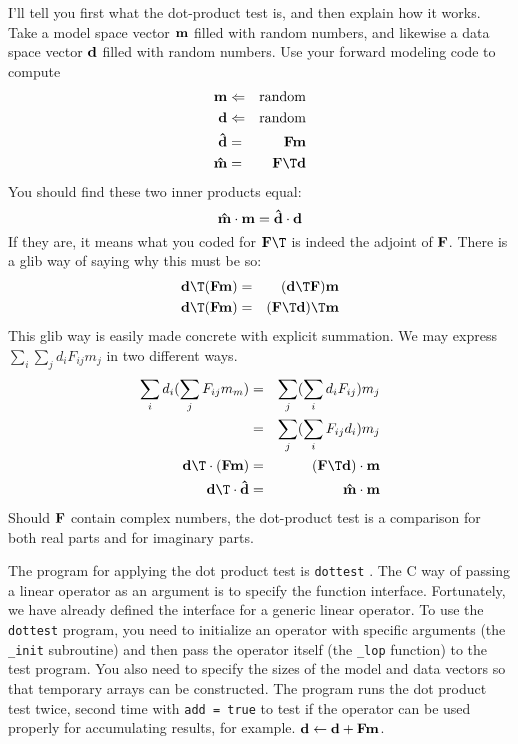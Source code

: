 \par
I'll tell you first what the dot-product test is,
and then explain how it works.
Take a model space vector $\bold m$ filled with random numbers, and likewise
a data space  vector $\bold d$ filled with random numbers.
Use your forward modeling code to compute
\begin{eqnarray}
\bold m & \Leftarrow & {\rm random}
\\
\bold d & \Leftarrow & {\rm random}
\\
\bold {\hat d} &=& \bold F \bold m
\\
\bold {\hat m} &=& \bold F\T \bold d
\end{eqnarray}
You should find these two inner products equal:
\begin{equation}
\bold {\hat m} \cdot \bold m  =
\bold {\hat d} \cdot \bold d
\end{equation}
If they are, it means what you coded for $\bold F\T$ is indeed the adjoint of $\bold F$.
There is a glib way of saying why this must be so:
\begin{eqnarray}
\bold d\T ( \bold F \bold m ) &=& ( \bold d\T \bold F )  \bold m   \\
\bold d\T ( \bold F \bold m ) &=& ( \bold F\T \bold d )\T \bold m 
\label{eqn:bilin2}
\end{eqnarray}
This glib way is easily made concrete with explicit summation.
We may express $\sum_i \sum_j d_i F_{ij} m_j$ in two different ways.
\begin{eqnarray}
\sum_i d_i ( \sum_j F_{ij} m_m) &=& \sum_j (\sum_i d_i F_{ij}     ) m_j
\\
                                &=& \sum_j (\sum_i     F_{ij} d_i ) m_j
\\
 \bold d\T \cdot (\bold F\bold m)     &=& (\bold F\T \bold d) \cdot  \bold m
\\
 \bold d\T \cdot \bold{\hat d}        &=& \bold{\hat m}\cdot  \bold m
\end{eqnarray}
Should $\bold F$ contain complex numbers, the dot-product test is a comparison
for both real parts and for imaginary parts.

\par
The program for applying the dot product test is \texttt{dottest}
. 
The C way of passing a linear operator
as an argument is to specify the function interface. Fortunately, we
have already defined the interface for a generic linear operator. To
use the \texttt{dottest} program, you need to initialize an operator
with specific arguments (the \texttt{\_init} subroutine) and then pass
the operator itself (the \texttt{\_lop} function) to the test program.
You also need to specify the sizes of the model and data vectors so
that temporary arrays can be constructed. The program runs the dot
product test twice, second time with \texttt{add = true} to test if
the operator can be used properly for accumulating results, for example.
$\bold d \leftarrow \bold d+\bold F\bold m$.

